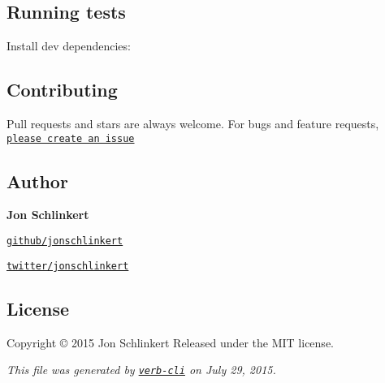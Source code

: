 \subsection*{Running tests}

Install dev dependencies\+:




\subsection*{Contributing}

Pull requests and stars are always welcome. For bugs and feature requests, \href{https://github.com/jonschlinkert/write/issues/new}{\tt please create an issue}

\subsection*{Author}

{\bfseries Jon Schlinkert}


\begin{DoxyItemize}
\item \href{https://github.com/jonschlinkert}{\tt github/jonschlinkert}
\item \href{http://twitter.com/jonschlinkert}{\tt twitter/jonschlinkert}
\end{DoxyItemize}

\subsection*{License}

Copyright © 2015 Jon Schlinkert Released under the M\+IT license.





{\itshape This file was generated by \href{https://github.com/assemble/verb-cli}{\tt verb-\/cli} on July 29, 2015.} 